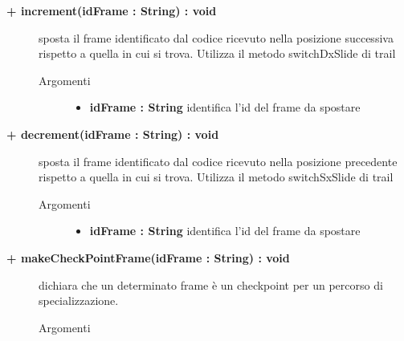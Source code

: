 \begin{description}
	\begin{description}
		\item[\textbf{\color{blue}+ increment(idFrame : String) : void			}] \hfill
			sposta il frame identificato dal codice ricevuto nella posizione successiva rispetto a quella in cui si trova. Utilizza il metodo switchDxSlide di trail
			
		\begin{description}
			\item[Argomenti] \hfill
				\begin{itemize}
				
					\item \textbf{idFrame : String			} \hfill
						identifica l'id del frame da spostare
					
				\end{itemize}
		\end{description}
	\end{description}
	
	\begin{description}
		\item[\textbf{\color{blue}+ decrement(idFrame : String) : void			}] \hfill
			sposta il frame identificato dal codice ricevuto nella posizione precedente rispetto a quella in cui si trova. Utilizza il metodo switchSxSlide di trail
			
		\begin{description}
			\item[Argomenti] \hfill
				\begin{itemize}
				
					\item \textbf{idFrame : String			} \hfill
						identifica l'id del frame da spostare
					
				\end{itemize}
		\end{description}
	\end{description}
	
	\begin{description}
		\item[\textbf{\color{blue}+ makeCheckPointFrame(idFrame : String) : void			}] \hfill
			dichiara che un determinato frame è un checkpoint per un percorso di specializzazione.
			
		\begin{description}
			\item[Argomenti] \hfill
				\begin{itemize}
				

\end{itemize}
\end{description}
\end{description}
\end{description}
